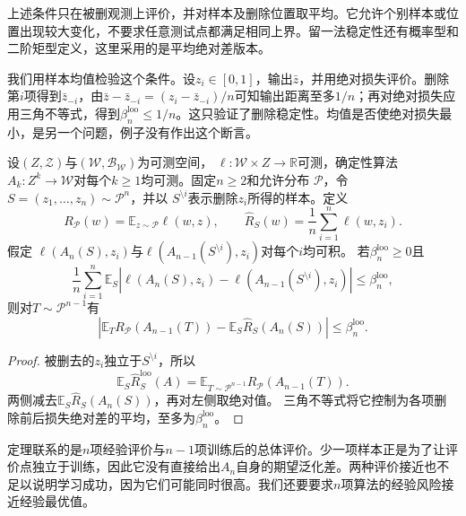 上述条件只在被删观测上评价，并对样本及删除位置取平均。它允许个别样本或位置出现较大变化，不要求任意测试点都满足相同上界。留一法稳定性还有概率型和二阶矩型定义，这里采用的是平均绝对差版本。

我们用样本均值检验这个条件。设$z_i\in[0,1]$，输出$\bar z$，并用绝对损失评价。删除第$i$项得到$\bar z_{-i}$，由$\bar z-\bar z_{-i}=(z_i-\bar z_{-i})/n$可知输出距离至多$1/n$；再对绝对损失应用三角不等式，得到$\beta_n^{\mathrm{loo}}\leq1/n$。这只验证了删除稳定性。均值是否使绝对损失最小，是另一个问题，例子没有作出这个断言。

\begin{theorem}[留一法稳定性与期望风险]
\label{thm:loo-risk}
设$(Z,\mathcal Z)$与$(\mathcal W,\mathcal B_{\mathcal W})$为可测空间，
$\ell:\mathcal W\times Z\to\mathbb R$可测，确定性算法
$A_k:Z^k\to\mathcal W$对每个$k\geq1$均可测。固定$n\geq2$和允许分布
$\mathcal P$，令$S=(z_1,\ldots,z_n)\sim\mathcal P^n$，并以
$S^{\setminus i}$表示删除$z_i$所得的样本。定义
\[
 R_{\mathcal P}(w)=\mathbb E_{z\sim\mathcal P}\ell(w,z),
 \qquad
 \hat R_S(w)=\frac1n\sum_{i=1}^n\ell(w,z_i).
\]
假定
$\ell(A_n(S),z_i)$与$\ell(A_{n-1}(S^{\setminus i}),z_i)$对每个$i$均可积。
若$\beta_n^{\mathrm{loo}}\geq0$且
\[
 \frac1n\sum_{i=1}^n\mathbb E_S
 \left|\ell(A_n(S),z_i)-\ell(A_{n-1}(S^{\setminus i}),z_i)\right|
 \leq\beta_n^{\mathrm{loo}},
\]
则对$T\sim\mathcal P^{n-1}$有
\[
 \left|\mathbb E_T R_{\mathcal P}(A_{n-1}(T))
       -\mathbb E_S\hat R_S(A_n(S))\right|\leq\beta_n^{\mathrm{loo}}.
\]
\end{theorem}
\begin{proof}
被删去的$z_i$独立于$S^{\setminus i}$，所以
\[
 \mathbb E_S\hat R_S^{\mathrm{loo}}(A)
 =\mathbb E_{T\sim\mathcal P^{n-1}}R_{\mathcal P}(A_{n-1}(T)).
\]
两侧减去$\mathbb E_S\hat R_S(A_n(S))$，再对左侧取绝对值。
三角不等式将它控制为各项删除前后损失绝对差的平均，至多为$\beta_n^{\mathrm{loo}}$。
\end{proof}

定理联系的是$n$项经验评价与$n-1$项训练后的总体评价。少一项样本正是为了让评价点独立于训练，因此它没有直接给出$A_n$自身的期望泛化差。两种评价接近也不足以说明学习成功，因为它们可能同时很高。我们还要要求$n$项算法的经验风险接近经验最优值。

